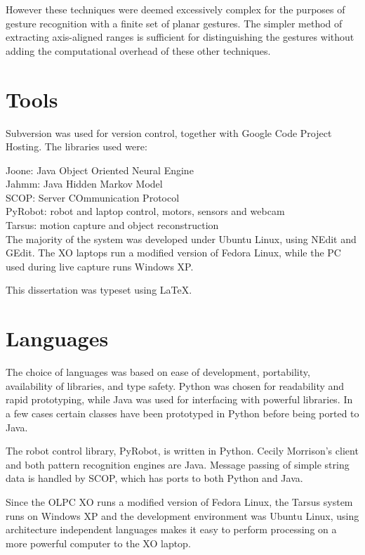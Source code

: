 \documentclass[12pt,a4,notitlepage]{report}
\renewcommand{\_}{\texttt{\symbol{95}}}
\newcommand{\<}{\texttt{\symbol{60}}}
\renewcommand{\>}{\texttt{\symbol{62}}}
\begin{document}
{However these techniques were deemed excessively complex for the purposes of gesture recognition with a finite set of planar gestures. The simpler method of extracting axis-aligned ranges is sufficient for distinguishing the gestures without adding the computational overhead of these other techniques.

\section{Tools}

Subversion was used for version control, together with Google Code Project Hosting. The libraries used were:

Joone: Java Object Oriented Neural Engine \\
Jahmm: Java Hidden Markov Model \\
SCOP: Server COmmunication Protocol \\
PyRobot: robot and laptop control, motors, sensors and webcam \\
Tarsus: motion capture and object reconstruction \\

The majority of the system was developed under Ubuntu Linux, using NEdit and GEdit. The XO laptops run a modified version of Fedora Linux, while the PC used during live capture runs Windows XP.

This dissertation was typeset using \LaTeX.

\section{Languages}

The choice of languages was based on ease of development, portability, availability of libraries, and type safety. Python was chosen for readability and rapid prototyping, while Java was used for interfacing with powerful libraries. In a few cases certain classes have been prototyped in Python before being ported to Java.

The robot control library, PyRobot, is written in Python. Cecily Morrison's client and both pattern recognition engines are Java. Message passing of simple string data is handled by SCOP, which has ports to both Python and Java.

Since the OLPC XO runs a modified version of Fedora Linux, the Tarsus system runs on Windows XP and the development environment was Ubuntu Linux, using architecture independent languages makes it easy to perform processing on a more powerful computer to the XO laptop.

}
\end{document}
